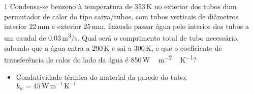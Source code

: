 \documentclass[\mainfilename]{subfiles}
\begin{document}
\begin{questionBox}1{ %
    Condensa-se benzeno à temperatura de 353\,\unit{\kelvin} no exterior dos tubos dum permutador de calor do tipo caixa/tubos, com tubos verticais de diâmetros interior 22\,\unit{\milli\metre} e exterior 25\,\unit{\milli\metre}, fazendo passar água pelo interior dos tubos a um caudal de 0.03\,\unit{\metre^3/\second}. Qual será o comprimento total de tubo necessário, sabendo que a água entra a 290\,\unit{\kelvin} e sai a 300\,\unit{\kelvin}, e que o coeficiente de transferência de calor do lado da água é 850\,\unit{\watt\,\metre^{-2}\,\kelvin^{-1}}?
} %
    
    \begin{itemize}
        \item Condutividade térmica do material da parede do tubo:\\
        \(k_w=45\,\unit{\watt\,\metre^{-1}\,\kelvin^{-1}}\)
    \end{itemize}


\end{questionBox}
\end{document}
